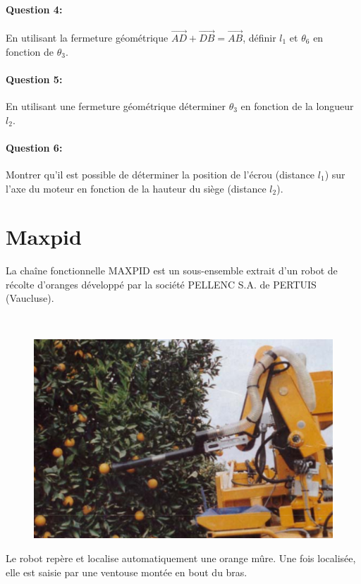 \paragraph{Question 4:} En utilisant la fermeture géométrique $\overrightarrow{AD}+\overrightarrow{DB}=\overrightarrow{AB}$, définir $l_1$ et $\theta_6$ en fonction de $\theta_3$.

\paragraph{Question 5:} En utilisant une fermeture géométrique déterminer $\theta_3$ en fonction de la longueur $l_2$.

\paragraph{Question 6:} Montrer qu'il est possible de déterminer la position de l'écrou (distance $l_1$) sur l'axe du moteur en fonction de la hauteur du siège (distance $l_2$).

\newpage

\section{Maxpid}

La  chaîne fonctionnelle MAXPID est un sous-ensemble extrait  d'un robot  de  récolte  d'oranges développé par la société PELLENC S.A. de PERTUIS (Vaucluse). 

~\

\begin{figure}
  \begin{center}
  \vspace{-1cm}
    \includegraphics[width=0.7\linewidth]{img/citrus}
  \end{center}
\end{figure}
Le robot repère et localise automatiquement une orange mûre. Une fois localisée, elle est saisie par une ventouse montée en bout du bras.


